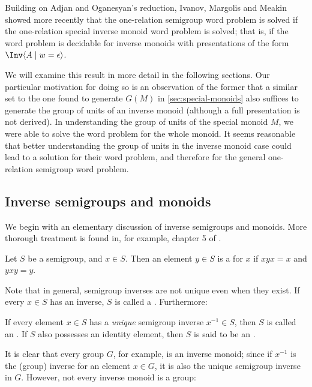 \documentclass[noindex,noinsetproof,12pt]{lmaths}
\begin{document}
Building on Adjan and Oganesyan's reduction, Ivanov, Margolis and Meakin \cite{Ivanov2001} showed more recently that the one-relation semigroup word problem is solved if the one-relation special inverse monoid word problem is solved; that is, if the word problem is decidable for inverse monoids with presentations of the form $\Inv \langle A \mid w = \epsilon\rangle$. 

We will examine this result in more detail in the following sections. Our particular motivation for doing so is an observation of the former that a similar set to the one found to generate $G(M)$ in \cref{sec:special-monoids} also suffices to generate the group of units of an inverse monoid (although a full presentation is not derived). In understanding the group of units of the special monoid $M$, we were able to solve the word problem for the whole monoid. It seems reasonable that better understanding the group of units in the inverse monoid case could lead to a solution for their word problem, and therefore for the general one-relation semigroup word problem.

\subsection{Inverse semigroups and monoids}

We begin with an elementary discussion of inverse semigroups and monoids. More thorough treatment is found in, for example, chapter 5 of \cite{Howie1995}.

\begin{defn}
	Let $S$ be a semigroup, and $x \in S$. Then an element $y \in S$ is a  for $x$ if $xyx = x$ and $yxy = y$.
\end{defn}

Note that in general, semigroup inverses are not unique even when they exist. If every $x \in S$ has an inverse, $S$ is called a . Furthermore:

\begin{defn}
	If every element $x \in S$ has a \emph{unique} semigroup inverse $x^{-1} \in S$, then $S$ is called an . If $S$ also possesses an identity element, then $S$ is said to be an .
\end{defn}

It is clear that every group $G$, for example, is an inverse monoid; since if $x^{-1}$ is the (group) inverse for an element $x \in G$, it is also the unique semigroup inverse in $G$. However, not every inverse monoid is a group:
\end{document}
